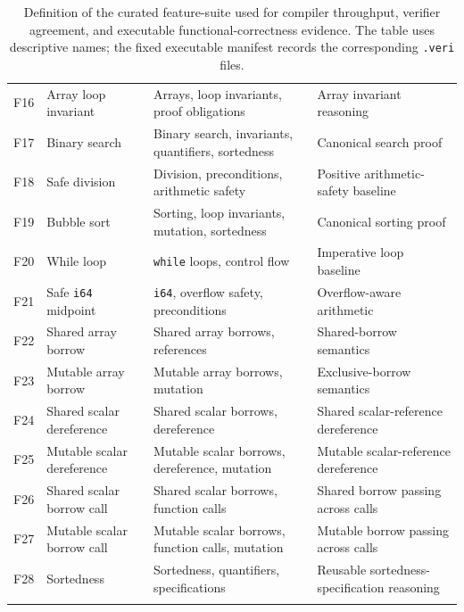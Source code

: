 \begin{table}[p]
\begin{tabular}{p{} p{} p{} p{}}
    F16 & Array loop invariant
        & Arrays, loop invariants, proof obligations
        & Array invariant reasoning \\
    F17 & Binary search
        & Binary search, invariants, quantifiers, sortedness
        & Canonical search proof \\
    F18 & Safe division
        & Division, preconditions, arithmetic safety
        & Positive arithmetic-safety baseline \\
    F19 & Bubble sort
        & Sorting, loop invariants, mutation, sortedness
        & Canonical sorting proof \\
    F20 & While loop
        & \texttt{while} loops, control flow
        & Imperative loop baseline \\
    F21 & Safe \texttt{i64} midpoint
        & \texttt{i64}, overflow safety, preconditions
        & Overflow-aware arithmetic \\
    F22 & Shared array borrow
        & Shared array borrows, references
        & Shared-borrow semantics \\
    F23 & Mutable array borrow
        & Mutable array borrows, mutation
        & Exclusive-borrow semantics \\
    F24 & Shared scalar dereference
        & Shared scalar borrows, dereference
        & Shared scalar-reference dereference \\
    F25 & Mutable scalar dereference
        & Mutable scalar borrows, dereference, mutation
        & Mutable scalar-reference dereference \\
    F26 & Shared scalar borrow call
        & Shared scalar borrows, function calls
        & Shared borrow passing across calls \\
    F27 & Mutable scalar borrow call
        & Mutable scalar borrows, function calls, mutation
        & Mutable borrow passing across calls \\
    F28 & Sortedness
        & Sortedness, quantifiers, specifications
        & Reusable sortedness-specification reasoning \\
    \tablehline
  \end{tabular}
  \caption{Definition of the curated feature-suite used for compiler throughput, verifier agreement, and executable functional-correctness evidence. The table uses descriptive names; the fixed executable manifest records the corresponding \texttt{.veri} files.}
  \label{tab:feature-suite-definition}
\end{table}

